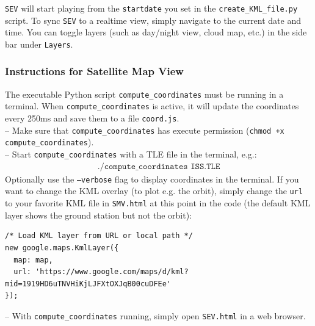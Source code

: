 \documentclass[10pt,a4paper]{article}
\begin{document}
\noindent \texttt{SEV} will start playing from the \texttt{startdate} you set in the \texttt{create\_KML\_file.py} script. To sync \texttt{SEV} to a realtime view, simply navigate to the current date and time. You can toggle layers (such as day/night view, cloud map, etc.) in the side bar under \texttt{Layers}.

\subsubsection{Instructions for Satellite Map View}
The executable Python script \texttt{compute\_coordinates} must be running in a terminal. When \texttt{compute\_coordinates} is active, it will update the coordinates every 250ms and save them to a file \texttt{coord.js}.\\
-- Make sure that \texttt{compute\_coordinates} has execute permission (\texttt{chmod +x compute\_coordinates}).\\
-- Start \texttt{compute\_coordinates} with a TLE file in the terminal, e.g.:
\begin{align*}
\texttt{./compute\_coordinates ISS.TLE}
\end{align*}
Optionally use the \texttt{--verbose} flag to display coordinates in the terminal. If you want to change the KML overlay (to plot e.g. the orbit), simply change the \texttt{url} to your favorite KML file in \texttt{SMV.html} at this point in the code (the default KML layer shows the ground station but not the orbit):
\begin{verbatim}
/* Load KML layer from URL or local path */
new google.maps.KmlLayer({
  map: map,
  url: 'https://www.google.com/maps/d/kml?mid=1919HD6uTNVHiKjLJFXtOXJqB00cuDFEe'
});
\end{verbatim}
\noindent -- With \texttt{compute\_coordinates} running, simply open \texttt{SEV.html} in a web browser.
\end{document}
